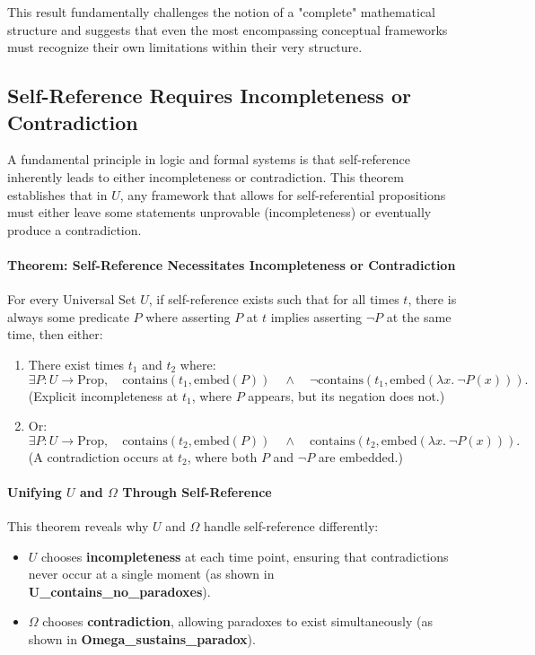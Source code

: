 \documentclass[12pt]{article}
\begin{document}
This result fundamentally challenges the notion of a "complete" mathematical structure and suggests that even the most encompassing conceptual frameworks must recognize their own limitations within their very structure.


\subsection{Self-Reference Requires Incompleteness or Contradiction}

A fundamental principle in logic and formal systems is that self-reference inherently leads to either incompleteness or contradiction. This theorem establishes that in \( U \), any framework that allows for self-referential propositions must either leave some statements unprovable (incompleteness) or eventually produce a contradiction.

\paragraph{Theorem: Self-Reference Necessitates Incompleteness or Contradiction}
For every Universal Set \( U \), if self-reference exists such that for all times \( t \), there is always some predicate \( P \) where asserting \( P \) at \( t \) implies asserting \( \neg P \) at the same time, then either:

\begin{enumerate}
    \item There exist times \( t_1 \) and \( t_2 \) where:
    \[
    \exists P: U \to \text{Prop}, \quad \text{contains}(t_1, \text{embed}(P)) \quad \wedge \quad \neg \text{contains}(t_1, \text{embed}(\lambda x.\ \neg P(x))).
    \]
    (Explicit incompleteness at \( t_1 \), where \( P \) appears, but its negation does not.)
    
    \item Or:
    \[
    \exists P: U \to \text{Prop}, \quad \text{contains}(t_2, \text{embed}(P)) \quad \wedge \quad \text{contains}(t_2, \text{embed}(\lambda x.\ \neg P(x))).
    \]
    (A contradiction occurs at \( t_2 \), where both \( P \) and \( \neg P \) are embedded.)
\end{enumerate}

\paragraph{Unifying \( U \) and \( \Omega \) Through Self-Reference}
This theorem reveals why \( U \) and \( \Omega \) handle self-reference differently:
\begin{itemize}
    \item \( U \) chooses \textbf{incompleteness} at each time point, ensuring that contradictions never occur at a single moment (as shown in \textbf{U\_contains\_no\_paradoxes}).
    \item \( \Omega \) chooses \textbf{contradiction}, allowing paradoxes to exist simultaneously (as shown in \textbf{Omega\_sustains\_paradox}).
\end{itemize}
\end{document}
